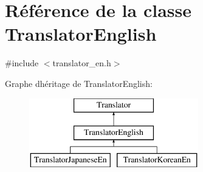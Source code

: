\hypertarget{class_translator_english}{}\section{Référence de la classe Translator\+English}
\label{class_translator_english}


{\ttfamily \#include $<$translator\+\_\+en.\+h$>$}

Graphe d\textquotesingle{}héritage de Translator\+English\+:\begin{figure}[H]
\begin{center}
\leavevmode
\includegraphics[height=3.000000cm]{class_translator_english}
\end{center}
\end{figure}

